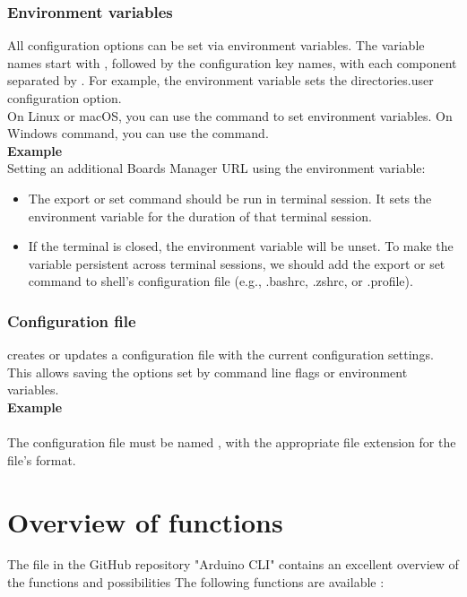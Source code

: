 \subsubsection{Environment variables}
All configuration options can be set via environment variables. The variable names start with , followed by the configuration key names, with each component separated by \SHELL{\_}. For example, the  environment variable sets the directories.user configuration option.
\\On Linux or macOS, you can use the  command to set environment variables. On Windows command, you can use the  command.
\\
\textbf{Example}
\\
Setting an additional Boards Manager URL using the  environment variable:
\\
\begin{itemize}
    \item The export or set command should be run in terminal session. It sets the environment variable for the duration of that terminal session.
    \item If the terminal is closed, the environment variable will be unset. To make the variable persistent across terminal sessions, we should add the export or set command to shell's configuration file (e.g., .bashrc, .zshrc, or .profile).
\end{itemize}

\subsubsection{Configuration file}
 creates or updates a configuration file with the current configuration settings.
This allows saving the options set by command line flags or environment variables. 
\\\textbf{Example}
\\
\\The configuration file must be named , with the appropriate file extension for the file's format.

\section{Overview of functions}
The file  in the GitHub repository "Arduino CLI" contains an excellent overview of the functions and possibilities \cite{ArduinoCLIGit:2024}
The following functions are available \cite{ArduinoCLI:2024}:

